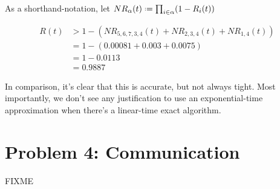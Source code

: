 \documentclass[a4paper,parskip,headheight=38pt]{scrartcl} %
\newcommand{\defeq}{\mathrel{\vcenter{\baselineskip0.5ex \lineskiplimit0pt
                    \hbox{\scriptsize.}\hbox{\scriptsize.}}}%
                    =}
\begin{document}
As a shorthand-notation, let $NR_{\alpha}(t) \defeq \prod_{i \in \alpha} (1-R_{i}(t))$

\begin{align*}
    R(t)
    &> 1-\left( NR_{5,6,7,3,4}(t) + NR_{2,3,4}(t) + NR_{1,4}(t) \right) \\
    &= 1-\left( 0.00081 + 0.003 + 0.0075 \right) \\
    &= 1 - 0.0113 \\
    &= 0.9887
\end{align*}

In comparison, it's clear that this is accurate, but not always tight.  Most
importantly, we don't see any justification to use an exponential-time
approximation when there's a linear-time exact algorithm.


\section*{Problem 4: Communication}

FIXME
\end{document}
